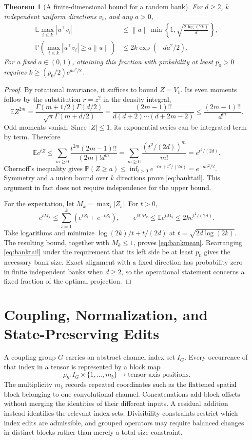 \documentclass[10pt]{article}
\theoremstyle{paper}
\newtheorem{theorem}{Theorem}[section]
\newcommand{\E}{\mathbb E}
\newcommand{\Prob}{\mathbb P}
\newcommand{\norm}[1]{\left\lVert #1\right\rVert}
\begin{document}
\begin{theorem}[A finite-dimensional bound for a random bank]
\label{thm:bank}
For $d\ge2$, $k$ independent uniform directions $v_i$, and any $a>0$,
\begin{align}
\E\max_{i\le k}|u^\top v_i|
&\le\norm u\min\left\{1,\sqrt{\frac{2\log(2k)}d}\right\},
\label{eq:bankmean}\\
\Prob\left(\max_{i\le k}|u^\top v_i|\ge a\norm u\right)
&\le2k\exp(-da^2/2).
\label{eq:banktail}
\end{align}
For a fixed $a\in(0,1)$, attaining this fraction with probability at least $p_0>0$ requires $k\ge(p_0/2)e^{da^2/2}$.
\end{theorem}
\begin{proof}
By rotational invariance, it suffices to bound $Z=V_1$. Its even moments follow by the substitution $r=z^2$ in the density integral,
\[
\E Z^{2m}=
\frac{\Gamma(m+1/2)\Gamma(d/2)}{\sqrt\pi\Gamma(m+d/2)}
=\frac{(2m-1)!!}{d(d+2)\cdots(d+2m-2)}
\le\frac{(2m-1)!!}{d^m}.
\]
Odd moments vanish. Since $|Z|\le1$, its exponential series can be integrated term by term. Therefore
\[
\E e^{tZ}\le\sum_{m\ge0}\frac{t^{2m}(2m-1)!!}{(2m)!d^m}
=\sum_{m\ge0}\frac{(t^2/(2d))^m}{m!}=e^{t^2/(2d)}.
\]
Chernoff's inequality gives $\Prob(Z\ge a)\le\inf_{t>0}e^{-ta+t^2/(2d)}=e^{-da^2/2}$. Symmetry and a union bound over $k$ directions prove \cref{eq:banktail}. This argument in fact does not require independence for the upper bound.

For the expectation, let $M_k=\max_i|Z_i|$. For $t>0$,
\[
e^{tM_k}\le\sum_{i=1}^k(e^{tZ_i}+e^{-tZ_i}),
\qquad e^{t\E M_k}\le\E e^{tM_k}\le2ke^{t^2/(2d)}.
\]
Take logarithms and minimize $\log(2k)/t+t/(2d)$ at $t=\sqrt{2d\log(2k)}$. The resulting bound, together with $M_k\le1$, proves \cref{eq:bankmean}. Rearranging \cref{eq:banktail} under the requirement that its left side be at least $p_0$ gives the necessary bank size. Exact alignment with a fixed direction has probability zero in finite independent banks when $d\ge2$, so the operational statement concerns a fixed fraction of the optimal projection.
\end{proof}

\section{Coupling, Normalization, and State-Preserving Edits}
\label{app:coupling}
A coupling group $G$ carries an abstract channel index set $I_G$. Every occurrence of that index in a tensor is represented by a block map
\begin{equation}
\rho_b:I_G\times\{1,\ldots,m_b\}\longrightarrow\text{tensor-axis positions}.
\label{eq:indexmap}
\end{equation}
The multiplicity $m_b$ records repeated coordinates such as the flattened spatial block belonging to one convolutional channel. Concatenations add block offsets without merging the identities of their different inputs. A residual addition instead identifies the relevant index sets. Divisibility constraints restrict which index edits are admissible, and grouped operators may require balanced changes in distinct blocks rather than merely a total-size constraint.
\end{document}
